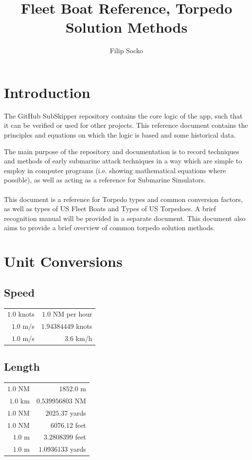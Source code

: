 \documentclass{article}
\author{Filip Socko}
\title{Fleet Boat Reference, Torpedo Solution Methods}
\begin{document}
\maketitle
\pagebreak
\tableofcontents
\pagebreak

\section{Introduction}
The GitHub SubSkipper repository contains the core logic of the app, such that it can be verified or used for other projects. This reference document contains the principles and equations on which the logic is based and some historical data.

The main purpose of the repository and documentation is to record techniques and methods of early submarine attack techniques in a way which are simple to employ in computer programs (i.e. showing mathematical equations where possible), as well as acting as a reference for Submarine Simulators.
\\ \\
This document is a reference for Torpedo types and common conversion factors, as well as types of US Fleet Boats and Types of US Torpedoes. A brief recognition manual will be provided in a separate document. This document also aims to provide a brief overview of common torpedo solution methods.

\section{Unit Conversions}

\subsection{Speed}
\begin{center}
\begin{tabular}{r | r}
$1.0$ knots & $1.0$ NM per hour\\
$1.0$ m/s & $1.94384449$ knots\\
$1.0$ m/s & $3.6$ km/h\\
\end{tabular}
\end{center}

\subsection{Length}
\begin{center}
\begin{tabular}{r | r}
$1.0$ NM & $1852.0$ m\\
$1.0$ km & $0.539956803$ NM\\
$1.0$ NM & $2025.37$ yards\\
$1.0$ NM & $6076.12$ feet\\
$1.0$ m & $3.2808399$ feet\\
$1.0$ m & $1.0936133$ yards\\
\end{tabular}
\end{center}
\end{document}
